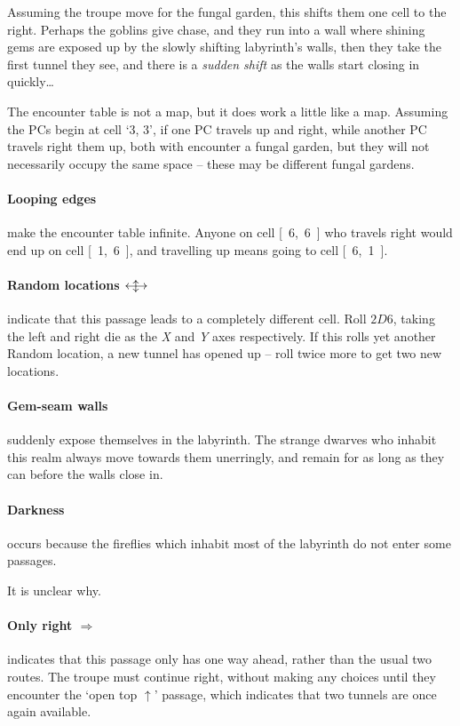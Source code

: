 \begin{multicols}{2}
\begin{exampletext}
  Assuming the troupe move for the fungal garden, this shifts them one cell to the right.
  Perhaps the goblins give chase, and they run into a wall where shining gems are exposed up by the slowly shifting labyrinth's walls, then they take the first tunnel they see, and there is a \textit{sudden shift} as the walls start closing in quickly\ldots
\end{exampletext}

The encounter table is not a map, but it does work a little like a map.
Assuming the PCs begin at cell `3, 3', if one PC travels up and right, while another PC travels right them up, both with encounter a fungal garden, but they will not necessarily occupy the same space -- these may be different fungal gardens.

\paragraph{Looping edges}
make the encounter table infinite.
Anyone on cell \mbox{[ 6, 6 ]} who travels right would end up on cell \mbox{[ 1, 6 ]}, and travelling up means going to cell \mbox{[ 6, 1 ]}.

\paragraph{Random locations $\longleftrightarrow\hspace{-1.2em}\updownarrow$}
indicate that this passage leads to a completely different cell.
Roll $2D6$, taking the left and right die as the \textit{X} and \textit{Y} axes respectively.
If this rolls yet another Random location, a new tunnel has opened up -- roll twice more to get two new locations.

\paragraph{Gem-seam walls}
suddenly expose themselves in the labyrinth.
The strange dwarves who inhabit this realm always move towards them unerringly, and remain for as long as they can before the walls close in.

\paragraph{Darkness}
occurs because the fireflies which inhabit most of the labyrinth do not enter some passages.

It is unclear why.

\paragraph{Only right $\Rightarrow$}
indicates that this passage only has one way ahead, rather than the usual two routes.
The troupe must continue right, without making any choices until they encounter the `open top $\uparrow$' passage, which indicates that two tunnels are once again available.


\end{multicols}
